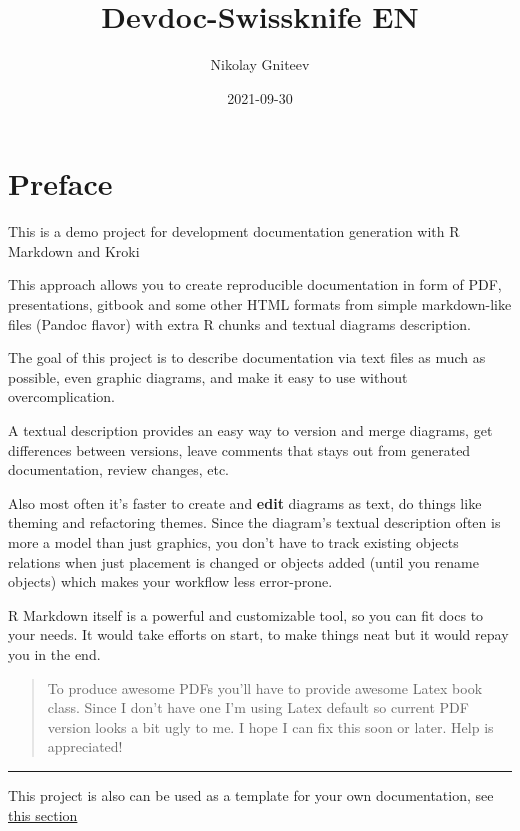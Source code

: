 \documentclass[12pt,a4paper,12pt,oneside,openany]{book}
\title{Devdoc-Swissknife EN}
\author{Nikolay Gniteev}
\date{2021-09-30}
\begin{document}
\maketitle

{
\hypersetup{linkcolor=black}
\setcounter{tocdepth}{2}
\tableofcontents
}
\chapter*{Preface}\label{preface}


This is a demo project for development documentation generation with R Markdown and Kroki

This approach allows you to create reproducible documentation in form of PDF, presentations, gitbook and some other HTML formats from simple markdown-like files (Pandoc flavor) with extra R chunks and textual diagrams description.

The goal of this project is to describe documentation via text files as much as possible, even graphic diagrams, and make it easy to use without overcomplication.

A textual description provides an easy way to version and merge diagrams, get differences between versions, leave comments that stays out from generated documentation, review changes, etc.

Also most often it's faster to create and \textbf{edit} diagrams as text, do things like theming and refactoring themes. Since the diagram's textual description often is more a model than just graphics, you don't have to track existing objects relations when just placement is changed or objects added (until you rename objects) which makes your workflow less error-prone.

R Markdown itself is a powerful and customizable tool, so you can fit docs to your needs. It would take efforts on start, to make things neat but it would repay you in the end.

\begin{quote}
To produce awesome PDFs you'll have to provide awesome Latex book class. Since I don't have one I'm using Latex default so current PDF version looks a bit ugly to me. I hope I can fix this soon or later. Help is appreciated!
\end{quote}

\begin{center}\rule{0.5\linewidth}{\linethickness}\end{center}

This project is also can be used as a template for your own documentation, see \protect\hyperlink{as_template}{this section}
\end{document}
